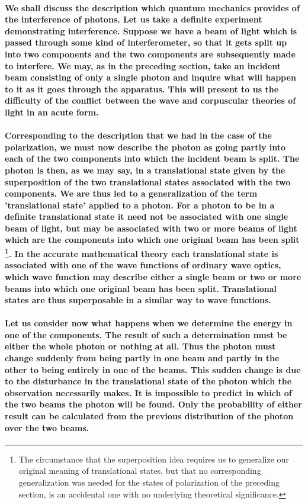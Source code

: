 \documentclass[10pt, kindle, oneside]{kindle}
\begin{document}
\paragraph{We shall discuss the description which quantum mechanics provides of the interference of photons. Let us take a definite experiment demonstrating interference. Suppose we have a beam of light which is passed through some kind of interferometer, so that it gets split up into two components and the two components are subsequently made to interfere. We may, as in the preceding section, take an incident beam consisting of only a single photon and inquire what will happen to it as it goes through the apparatus. This will present to us the difficulty of the conflict between the wave and corpuscular theories of light in an acute form.}
\paragraph{Corresponding to the description that we had in the case of the polarization, we must now describe the photon as going partly into each of the two components into which the incident beam is split. The photon is then, as we may say, in a translational state given by the superposition of the two translational states associated with the two components. We are thus led to a generalization of the term 'translational state' applied to a photon. For a photon to be in a definite translational state it need not be associated with one single beam of light, but may be associated with two or more beams of light which are the components into which one original beam has been split \footnote{The circumstance that the superposition idea requires us to generalize our original meaning of translational states, but that no corresponding generalization was needed for the states of polarization of the preceding section, is an accidental one with no underlying theoretical significance.}. In the accurate mathematical theory each translational state is associated with one of the wave functions of ordinary wave optics, which wave function may describe either a single beam or two or more beams into which one original beam has been split. Translational states are thus superposable in a similar way to wave functions.}
\paragraph{Let us consider now what happens when we determine the energy in one of the components. The result of such a determination must be either the whole photon or nothing at all. Thus the photon must change suddenly from being partly in one beam and partly in the other to being entirely in one of the beams. This sudden change is due to the disturbance in the translational state of the photon which the observation necessarily makes. It is impossible to predict in which of the two beams the photon will be found. Only the probability of either result can be calculated from the previous distribution of the photon over the two beams.}
\end{document}
